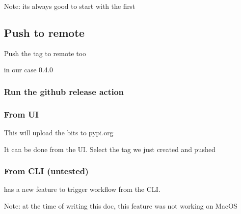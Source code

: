 \documentclass[letterpaper,10pt,english]{sphinxmanual}
\begin{document}
\sphinxAtStartPar
Note: its always good to start with the  first


\subsection{Push to remote}
\label{\detokenize{index:push-to-remote}}
\begin{sphinxVerbatim}[commandchars=\\\{\}]
 
\end{sphinxVerbatim}

\begin{DUlineblock}{0em}
\item[] Push the tag to remote too
\item[] in our case 0.4.0 
\end{DUlineblock}

\begin{sphinxVerbatim}[commandchars=\\\{\}]
   
\end{sphinxVerbatim}


\subsubsection{Run the github release action}
\label{\detokenize{index:run-the-github-release-action}}

\subsubsection{From UI}
\label{\detokenize{index:from-ui}}
\begin{DUlineblock}{0em}
\item[] This will upload the bits to pypi.org
\item[] It can be done from the UI. Select the tag we just created and pushed
\end{DUlineblock}


\subsubsection{From CLI (untested)}
\label{\detokenize{index:from-cli-untested}}
\begin{DUlineblock}{0em}
\item[]  has a new feature to trigger workflow from the CLI.
\item[] Note: at the time of writing this doc, this feature was not working on MacOS
\end{DUlineblock}

\begin{sphinxVerbatim}[commandchars=\\\{\}]
   
\end{sphinxVerbatim}



\renewcommand{\indexname}{Index}
\printindex
\end{document}
